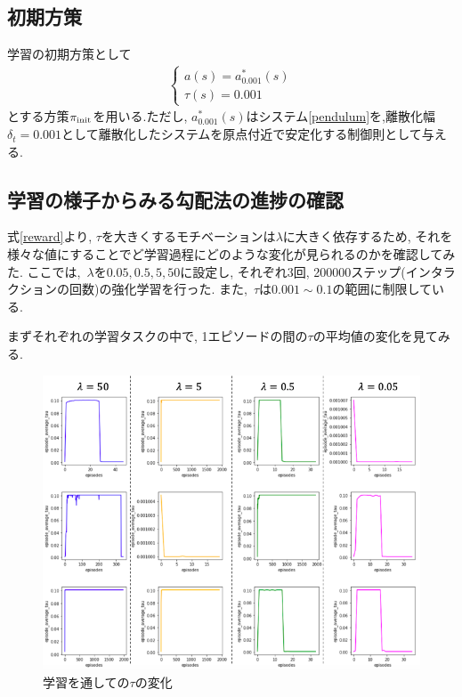 \documentclass{jsarticle}
\begin{document}
\subsection{初期方策}
学習の初期方策として
\begin{align}
\begin{cases}
	a(s)=a_{0.001}^{*}(s)\\
	\tau(s)=0.001
\end{cases} \label{pi_init}
\end{align}
とする方策$\pi_{\rm{init}}$を用いる.ただし, $a_{0.001}^{*}(s)$はシステム\eqref{pendulum}を,離散化幅$\delta_t=0.001$として離散化したシステムを原点付近で安定化する制御則として与える.

\subsection{学習の様子からみる勾配法の進捗の確認}
式\eqref{reward}より, $\tau$を大きくするモチベーションは$\lambda$に大きく依存するため, それを様々な値にすることでど学習過程にどのような変化が見られるのかを確認してみた. ここでは,~$\lambda$を$0.05, 0.5, 5, 50$に設定し, それぞれ3回, 200000ステップ(インタラクションの回数)の強化学習を行った. また,~$\tau$は$0.001\sim0.1$の範囲に制限している.\par
まずそれぞれの学習タスクの中で, 1エピソードの間の$\tau$の平均値の変化を見てみる.\par
\begin{figure}[h]
	\centering
 	\includegraphics[width=14cm]{tau_exp_ave.png}
 	\caption{学習を通しての$\tau$の変化} \label{average_tau}
\end{figure}\par
\end{document}
